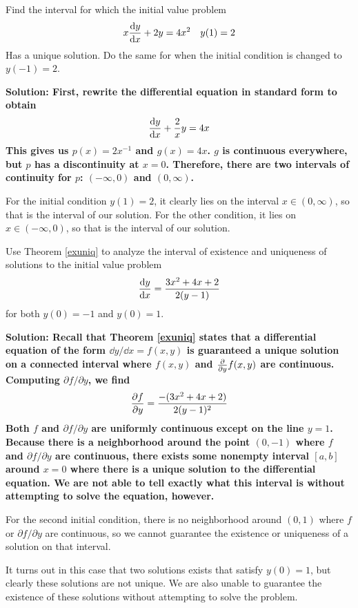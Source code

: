 \begin{example}
    Find the interval for which the initial value problem
    \[ x\dv{y}{x} + 2y = 4x^2 \quad y(1) = 2\]
    Has a unique solution. Do the same for when the initial condition is changed to $y(-1) = 2$. \par
    \bf{Solution:} First, rewrite the differential equation in standard form to obtain
    \[ \dv{y}{x} + \frac{2}{x} y = 4x \]
    This gives us $p(x) = 2x^{-1}$ and $g(x) = 4x$. $g$ is continuous everywhere, but $p$ has a discontinuity at $x=0$. Therefore, there are two intervals of continuity for $p$: $(-\infty, 0)$ and $(0, \infty)$. \par
    For the initial condition $y(1)=2$, it clearly lies on the interval $x\in (0, \infty)$, so that is the interval of our solution. For the other condition, it lies on $x\in(-\infty, 0)$, so that is the interval of our solution.
\end{example}
\begin{example}
    Use Theorem \ref{exuniq} to analyze the interval of existence and uniqueness of solutions to the initial value problem
    \[ \dv{y}{x} = \frac{3x^2+4x+2}{2(y-1)}\] 
    for both $y(0)=-1$ and $y(0)=1$. \par
    \bf{Solution:} Recall that Theorem \ref{exuniq} states that a differential equation of the form $\dd y/\dd x = f(x,y)$ is guaranteed a unique solution on a connected interval where $f(x,y)$ and $\pdv{y} f(x,y)$ are continuous. Computing $\partial f/\partial y$, we find
    \[ \pdv{f}{y} = \frac{-(3x^2+4x+2)}{2(y-1)^2} \]
    Both $f$ and $\partial f/\partial y$ are uniformly continuous except on the line $y=1$. Because there is a neighborhood around the point $(0, -1)$ where $f$ and $\partial f/\partial y$ are continuous, there exists some nonempty interval $[a,b]$ around $x=0$ where there is a unique solution to the differential equation. We are not able to tell exactly what this interval is without attempting to solve the equation, however. \par
    For the second initial condition, there is no neighborhood around $(0, 1)$ where $f$ or $\partial f/\partial y$ are continuous, so we cannot guarantee the existence or uniqueness of a solution on that interval. \par
    It turns out in this case that two solutions exists that satisfy $y(0)=1$, but clearly these solutions are not unique. We are also unable to guarantee the existence of these solutions without attempting to solve the problem. 
\end{example}
